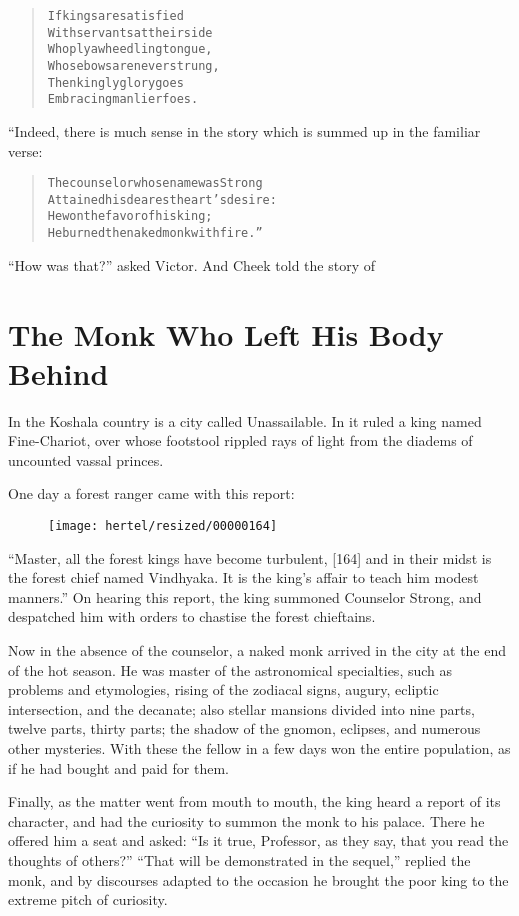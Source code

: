 \documentclass[article, twoside, 10pt]{memoir}
\renewenvironment{verbatim}{%
\begin{quote}%
\vskip -10pt%
\begin{alltt}\normalfont\small}{\end{alltt}%
\end{quote}%
\vskip -10pt
} %
\begin{document}
\begin{verbatim}
If kings are satisfied
With servants at their side
Who ply a wheedling tongue,
Whose bows are never strung,
Then kingly glory goes
Embracing manlier foes.
\end{verbatim}
“Indeed, there is much sense in the story which is summed up in the
familiar verse:

\begin{verbatim}
The counselor whose name was Strong
    Attained his dearest heart's desire:
He won the favor of his king;
    He burned the naked monk with fire.”
\end{verbatim}
``How was that?'' asked Victor. And Cheek told the story of

\chapter{The Monk Who Left His Body Behind}

In the Koshala country is a city called Unassailable. In it ruled a
king named Fine-Chariot, over whose footstool rippled rays of light
from the diadems of uncounted vassal princes.

One day a forest ranger came with this report:
\begin{figure}[p]\texttt{[image: hertel/resized/00000164]}\end{figure}``Master, all the forest kings have become turbulent, [164] and in their midst is the forest chief named Vindhyaka. It is the king's affair to teach him modest manners.''
On hearing this report, the king summoned Counselor Strong, and
despatched him with orders to chastise the forest chieftains.

Now in the absence of the counselor, a naked monk arrived in the
city at the end of the hot season. He was master of the
astronomical specialties, such as problems and etymologies, rising
of the zodiacal signs, augury, ecliptic intersection, and the
decanate; also stellar mansions divided into nine parts, twelve
parts, thirty parts; the shadow of the gnomon, eclipses, and
numerous other mysteries. With these the fellow in a few days won
the entire population, as if he had bought and paid for them.

Finally, as the matter went from mouth to mouth, the king heard a
report of its character, and had the curiosity to summon the monk
to his palace. There he offered him a seat and asked:
``Is it true, Professor, as they say, that you read the thoughts of others?''
``That will be demonstrated in the sequel,'' replied the monk, and
by discourses adapted to the occasion he brought the poor king to
the extreme pitch of curiosity.
\end{document}
